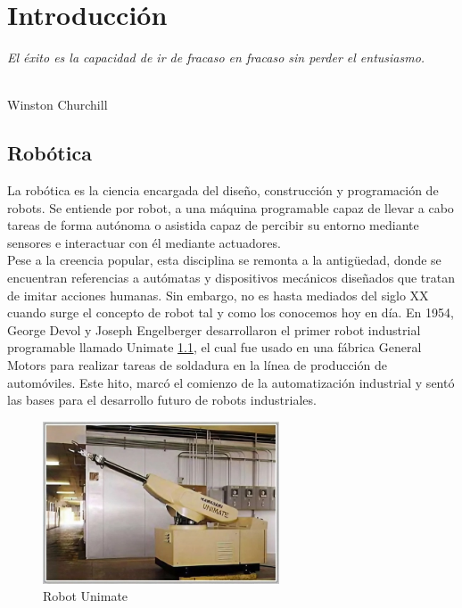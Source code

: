 \chapter{Introducción}
\label{cap:capitulo1}
\setcounter{page}{1}

\begin{flushright}
\begin{minipage}[]{10cm}
\emph{El éxito es la capacidad de ir de fracaso en fracaso sin perder el entusiasmo.}\\
\end{minipage}\\

Winston Churchill\\
\end{flushright}


\section{Robótica}
\label{sec:rob}
La robótica es la ciencia encargada del diseño, construcción y programación de robots. Se entiende por robot, a una máquina programable 
capaz de llevar a cabo tareas de forma autónoma o asistida capaz de percibir su entorno mediante sensores e interactuar con él mediante 
actuadores.\\
Pese a la creencia popular, esta disciplina se remonta a la antigüedad, donde se encuentran referencias a autómatas y dispositivos mecánicos diseñados 
que tratan de imitar acciones humanas. Sin embargo, no es hasta mediados del siglo XX cuando surge el concepto de robot tal y como los conocemos hoy en día. 
En 1954, George Devol y Joseph Engelberger desarrollaron el primer robot industrial programable llamado Unimate \ref{fig:unimate}, el cual fue usado en una fábrica General Motors 
para realizar tareas de soldadura en la línea de producción de automóviles. Este hito, marcó el comienzo de la automatización industrial y sentó las bases para 
el desarrollo futuro de robots industriales.
\begin{figure} [ht!]
  \begin{center}
    \includegraphics[width=7cm]{figs/unimate.jpg}
  \end{center}
  \caption{Robot Unimate}
  \label{fig:unimate}
\end{figure}\ 

